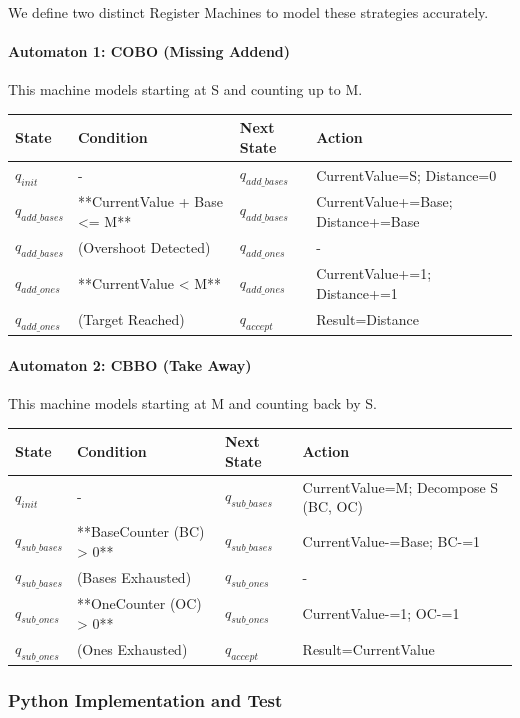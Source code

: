 \documentclass[11pt]{article}
\begin{document}
We define two distinct Register Machines to model these strategies accurately.

\paragraph{Automaton 1: COBO (Missing Addend)}
This machine models starting at S and counting up to M.
\begin{longtable}{|l|l|l|l|}
\hline
\textbf{State} & \textbf{Condition} & \textbf{Next State} & \textbf{Action} \\
\hline
\endhead
$q_{init}$ & - & $q_{add\_bases}$ & CurrentValue=S; Distance=0 \\
\hline
$q_{add\_bases}$ & **CurrentValue + Base <= M** & $q_{add\_bases}$ & CurrentValue+=Base; Distance+=Base \\
\hline
$q_{add\_bases}$ & (Overshoot Detected) & $q_{add\_ones}$ & - \\
\hline
$q_{add\_ones}$ & **CurrentValue < M** & $q_{add\_ones}$ & CurrentValue+=1; Distance+=1 \\
\hline
$q_{add\_ones}$ & (Target Reached) & $q_{accept}$ & Result=Distance \\
\hline
\end{longtable}

\paragraph{Automaton 2: CBBO (Take Away)}
This machine models starting at M and counting back by S.
\begin{longtable}{|l|l|l|l|}
\hline
\textbf{State} & \textbf{Condition} & \textbf{Next State} & \textbf{Action} \\
\hline
\endhead
$q_{init}$ & - & $q_{sub\_bases}$ & CurrentValue=M; Decompose S (BC, OC) \\
\hline
$q_{sub\_bases}$ & **BaseCounter (BC) > 0** & $q_{sub\_bases}$ & CurrentValue-=Base; BC-=1 \\
\hline
$q_{sub\_bases}$ & (Bases Exhausted) & $q_{sub\_ones}$ & - \\
\hline
$q_{sub\_ones}$ & **OneCounter (OC) > 0** & $q_{sub\_ones}$ & CurrentValue-=1; OC-=1 \\
\hline
$q_{sub\_ones}$ & (Ones Exhausted) & $q_{accept}$ & Result=CurrentValue \\
\hline
\end{longtable}

\subsubsection*{Python Implementation and Test}
\end{document}
